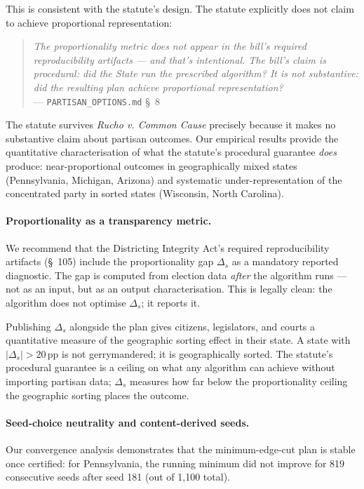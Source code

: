 This is consistent with the statute's design. The statute explicitly does not
claim to achieve proportional representation:

\begin{quote}
\emph{The proportionality metric does not appear in the bill's required
reproducibility artifacts --- and that's intentional. The bill's claim is
procedural: did the State run the prescribed algorithm? It is not substantive:
did the resulting plan achieve proportional representation?}\\
\hspace*{\fill}--- \texttt{PARTISAN\_OPTIONS.md} \S~8
\end{quote}

The statute survives \textit{Rucho v. Common Cause} precisely because it makes
no substantive claim about partisan outcomes. Our empirical results provide the
quantitative characterisation of what the statute's procedural guarantee
\emph{does} produce: near-proportional outcomes in geographically mixed states
(Pennsylvania, Michigan, Arizona) and systematic under-representation of the
concentrated party in sorted states (Wisconsin, North Carolina).

\paragraph{Proportionality as a transparency metric.}
We recommend that the Districting Integrity Act's required reproducibility
artifacts (\S~105) include the proportionality gap $\Delta_s$ as a mandatory
reported diagnostic. The gap is computed from election data \emph{after} the
algorithm runs --- not as an input, but as an output characterisation. This
is legally clean: the algorithm does not optimise $\Delta_s$; it reports it.

Publishing $\Delta_s$ alongside the plan gives citizens, legislators, and courts
a quantitative measure of the geographic sorting effect in their state. A state
with $|\Delta_s| > 20$\,pp is not gerrymandered; it is geographically sorted.
The statute's procedural guarantee is a ceiling on what any algorithm can
achieve without importing partisan data; $\Delta_s$ measures how far below the
proportionality ceiling the geographic sorting places the outcome.

\paragraph{Seed-choice neutrality and content-derived seeds.}
Our convergence analysis demonstrates that the minimum-edge-cut plan is
stable once certified: for Pennsylvania, the running minimum did not improve
for 819 consecutive seeds after seed 181 (out of 1{,}100 total).

